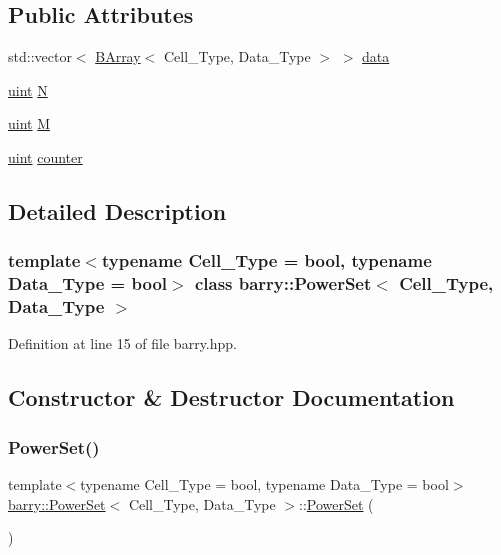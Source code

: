\subsection*{Public Attributes}
\begin{DoxyCompactItemize}
\item 
std\+::vector$<$ \hyperlink{classbarry_1_1_b_array}{B\+Array}$<$ Cell\+\_\+\+Type, Data\+\_\+\+Type $>$ $>$ \hyperlink{classbarry_1_1_power_set_a0484531e1f473af904d8045d375dabd7}{data}
\item 
\hyperlink{namespacebarry_a11dfc53ddb4672278319aa04f1e09a6c}{uint} \hyperlink{classbarry_1_1_power_set_aaa3bac8806b743aa84b18eb904b2f034}{N}
\item 
\hyperlink{namespacebarry_a11dfc53ddb4672278319aa04f1e09a6c}{uint} \hyperlink{classbarry_1_1_power_set_a33f837a6cdcbaec8d06a3ce3311ea4ca}{M}
\item 
\hyperlink{namespacebarry_a11dfc53ddb4672278319aa04f1e09a6c}{uint} \hyperlink{classbarry_1_1_power_set_a5d318c7894867263313e2907c8821c70}{counter}
\end{DoxyCompactItemize}


\subsection{Detailed Description}
\subsubsection*{template$<$typename Cell\+\_\+\+Type = bool, typename Data\+\_\+\+Type = bool$>$\newline
class barry\+::\+Power\+Set$<$ Cell\+\_\+\+Type, Data\+\_\+\+Type $>$}



Definition at line 15 of file barry.\+hpp.



\subsection{Constructor \& Destructor Documentation}
\mbox{\label{classbarry_1_1_power_set_ad9e3904c7f7052d724603bc28acd18d1}} 
\subsubsection{\texorpdfstring{Power\+Set()}{PowerSet()}\hspace{0.1cm}{\footnotesize\ttfamily [1/2]}}
{\footnotesize\ttfamily template$<$typename Cell\+\_\+\+Type  = bool, typename Data\+\_\+\+Type  = bool$>$ \\
\hyperlink{classbarry_1_1_power_set}{barry\+::\+Power\+Set}$<$ Cell\+\_\+\+Type, Data\+\_\+\+Type $>$\+::\hyperlink{classbarry_1_1_power_set}{Power\+Set} (\begin{DoxyParamCaption}{ }\end{DoxyParamCaption})\hspace{0.3cm}{\ttfamily [inline]}}




